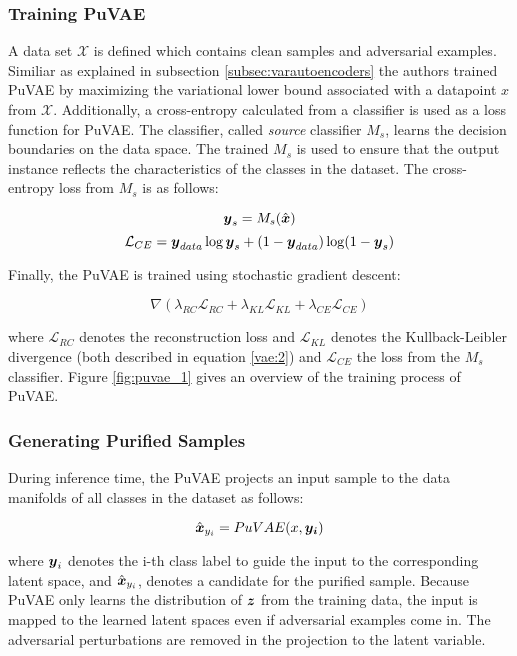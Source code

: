 \subsubsection{Training PuVAE}
A data set $\mathcal{X}$ is defined which contains clean samples and adversarial
examples. Similiar as explained in subsection \ref{subsec:varautoencoders} the
authors trained PuVAE by maximizing the variational lower bound associated with
a datapoint $x$ from $\mathcal{X}$. Additionally, a cross-entropy calculated
from a classifier is used as a loss function for PuVAE. The classifier, called
\textit{source} classifier $M_{s}$, learns the decision boundaries on the data
space. The trained $M_{s}$ is used to ensure that the output instance reflects
the characteristics of the classes in the dataset. The cross-entropy loss from
$M_{s}$ is as follows:

\begin{equation}
    \boldsymbol{y}_{s} = M_{s}(\hat{\boldsymbol{x}})
\end{equation}
\begin{equation}
    \mathcal{L}_{CE} = \boldsymbol{y}_{data} \log \boldsymbol{y}_{s} + (1 - \boldsymbol{y}_{data}) \log (1 - \boldsymbol{y}_s)
\end{equation}

Finally, the PuVAE is trained using stochastic gradient descent:

\begin{equation}
    \nabla(\lambda_{RC} \mathcal{L}_{RC} + \lambda_{KL} \mathcal{L}_{KL} + \lambda_{CE} \mathcal{L}_{CE})
\end{equation}

where $\mathcal{L}_{RC}$ denotes the reconstruction loss and $\mathcal{L}_{KL}$
denotes the Kullback-Leibler divergence (both described in equation \ref{vae:2})
and $\mathcal{L}_{CE}$ the loss from the $M_{s}$ classifier. Figure
\ref{fig:puvae_1} gives an overview of the training process of PuVAE.


\subsubsection{Generating Purified Samples}
During inference time, the PuVAE projects an input sample to the data manifolds
of all classes in the dataset as follows:

\begin{equation}
    \hat{\boldsymbol{x}}_{y_i} = PuVAE(x, \boldsymbol{y_{i}})
\end{equation}

where $\boldsymbol{y}_i$ denotes the i-th class label to guide the input to the
corresponding latent space, and $\hat{\boldsymbol{x}}_{y_i}$, denotes a candidate for
the purified sample. Because PuVAE only learns the distribution of $\boldsymbol{z}$
from the training data, the input is mapped to the learned latent spaces even if
adversarial examples come in. The adversarial perturbations are removed in the
projection to the latent variable.


